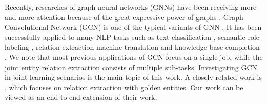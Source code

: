 Recently,
researches of graph neural networks (GNNs) have been receiving more and more attention 
because of the great expressive power of graphs \cite{cai2018comprehensive,battaglia2018relational,zhou2018graph}.
Graph Convolutional Network (GCN) is one of the typical variants of GNN
\cite{bruna2013spectral,defferrard2016convolutional,kipf2017semi}.
It has been successfully applied to many NLP tasks
such as text classification \cite{yao2018graph},
semantic role labeling \cite{marcheggiani2017encoding},
relation extraction \cite{zhang2018graph}
machine translation \cite{bastings2017graph} and
knowledge base completion \cite{shang2018end}.
We note that most previous applications of GCN focus on a single job,
while the joint entity relation extraction consists of multiple sub-tasks.
Investigating GCN in joint learning scenarios is the main topic of this work.
A closely related work is \cite{P18-2014}, which focuses on relation extraction with golden entities.
Our work can be viewed as an end-to-end extension of their work.







